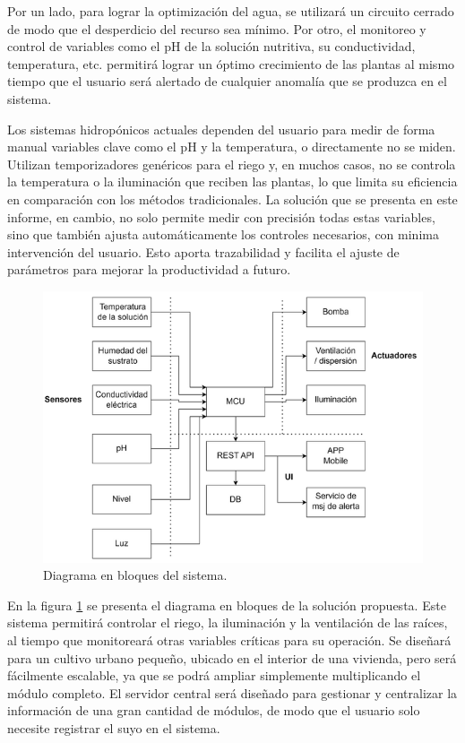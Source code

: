 \documentclass[
11pt, %
]{charter}
\begin{document}
Por un lado, para lograr  la optimización del agua, se utilizará un circuito cerrado de modo que el desperdicio del recurso sea mínimo. Por otro, el monitoreo y control de variables como el pH de la solución nutritiva, su conductividad, temperatura, etc. permitirá lograr un óptimo crecimiento de las plantas al mismo tiempo que el usuario será alertado de cualquier anomalía que se produzca en el sistema.

Los sistemas hidropónicos actuales dependen del usuario para medir de forma manual variables clave como el pH y la temperatura, o directamente no se miden. Utilizan temporizadores genéricos para el riego y, en muchos casos, no se controla la temperatura o la iluminación que reciben las plantas, lo que limita su eficiencia en comparación con los métodos tradicionales. La solución que se presenta en este informe, en cambio, no solo permite medir con precisión todas estas variables, sino que también ajusta automáticamente los controles necesarios, con minima intervención del usuario. Esto aporta trazabilidad y facilita el ajuste de parámetros para mejorar la productividad a futuro.

\begin{figure}[htpb]
\centering 
\includegraphics[width=.85\textwidth]{./Figuras/d_bloques.png}
\caption{Diagrama en bloques del sistema.}
\label{fig:d_bloques}
\end{figure}

En la figura \ref{fig:d_bloques} se presenta el diagrama en bloques de la solución propuesta. Este sistema permitirá controlar el riego, la iluminación y la ventilación de las raíces, al tiempo que monitoreará otras variables críticas para su operación. Se diseñará para un cultivo urbano pequeño, ubicado en el interior de una vivienda, pero será fácilmente escalable, ya que se podrá ampliar simplemente multiplicando el módulo completo. El servidor central será diseñado para gestionar y centralizar la información de una gran cantidad de módulos, de modo que el usuario solo necesite registrar el suyo en el sistema.
\end{document}
